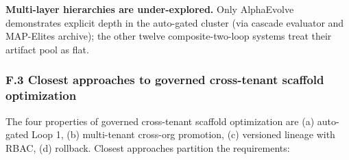 \textbf{Multi-layer hierarchies are under-explored.} Only AlphaEvolve
demonstrates explicit depth in the auto-gated cluster (via cascade
evaluator and MAP-Elites archive); the other twelve composite-two-loop
systems treat their artifact pool as flat.

\subsubsection{F.3 Closest approaches to governed cross-tenant scaffold
optimization}\label{f.3-closest-approaches-to-governed-cross-tenant-scaffold-optimization}

The four properties of governed cross-tenant scaffold optimization are
(a) auto-gated Loop 1, (b) multi-tenant cross-org promotion, (c)
versioned lineage with RBAC, (d) rollback. Closest approaches partition
the requirements:

